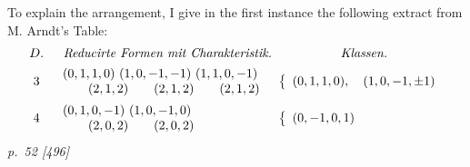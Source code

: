 ﻿\documentclass[11pt,a4paper]{article}
\theoremstyle{plain}
\theoremstyle{definition}
\begin{document}
To explain the arrangement, I give in the first instance the following
extract from M. Arndt's Table:
\[
\begin{array}{c@{\quad}l@{\quad}l}
D. & \multicolumn{1}{c}{\textit{Reducirte Formen mit Charakteristik.}}
& \multicolumn{1}{c}{\textit{Klassen.}}\\[0.4em]
3&
\begin{array}{l}
(0,1,1,0)\ (1,0,-1,-1)\ (1,1,0,-1)\\
\qquad(2,1,2)\qquad(2,1,2)\qquad(2,1,2)
\end{array}
&
\left\{\begin{array}{l}
(0,1,1,0),\quad (1,0,-1,\pm1)
\end{array}\right.\\[1.1em]
4&
\begin{array}{l}
(0,1,0,-1)\ (1,0,-1,0)\\
\qquad(2,0,2)\qquad(2,0,2)
\end{array}
&
\left\{\begin{array}{l}
(0,-1,0,1)
\end{array}\right.
\end{array}
\]
\textit{p.~52 [496]}
\end{document}
